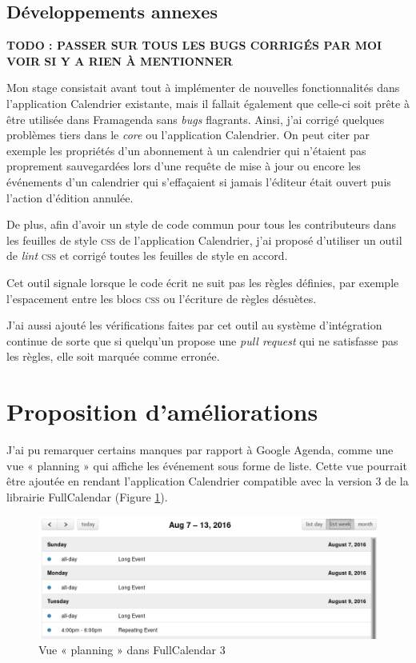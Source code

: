 \documentclass[10pt,a4paper, twoside]{report}
\begin{document}
	\subsection{Développements annexes}
	
	\textbf{\color{red}TODO : PASSER SUR TOUS LES BUGS CORRIGÉS PAR MOI VOIR SI Y A RIEN À MENTIONNER}
	
	Mon stage consistait avant tout à implémenter de nouvelles fonctionnalités dans l'application Calendrier existante, mais il fallait également que celle-ci soit prête à être utilisée dans Framagenda sans \textit{bugs} flagrants. Ainsi, j'ai corrigé quelques problèmes tiers dans le \textit{core} ou l'application Calendrier.
	On peut citer par exemple les propriétés d'un abonnement à un calendrier qui n'étaient pas proprement sauvegardées lors d'une requête de mise à jour ou encore les événements d'un calendrier qui s'effaçaient si jamais l'éditeur était ouvert puis l'action d'édition annulée.
	
	De plus, afin d'avoir un style de code commun pour tous les contributeurs dans les feuilles de style \textsc{css} de l'application Calendrier, j'ai proposé d'utiliser un outil de \textit{lint} \textsc{css} et corrigé toutes les feuilles de style en accord. 
	
	Cet outil signale lorsque le code écrit ne suit pas les règles définies, par exemple l'espacement entre les blocs \textsc{css} ou l'écriture de règles désuètes.
	
	J'ai aussi ajouté les vérifications faites par cet outil au système d'intégration continue de sorte que si quelqu'un propose une \textit{pull request} qui ne satisfasse pas les règles, elle soit marquée comme erronée.

	\section{Proposition d'améliorations}
	J'ai pu remarquer certains manques par rapport à Google Agenda, comme une vue « planning » qui affiche les événement sous forme de liste. Cette vue pourrait être ajoutée en rendant l'application Calendrier compatible avec la version 3 de la librairie FullCalendar (Figure \ref{planning-fullcalendar}).
	
	\begin{figure}[ht]
		\centering
		\centerline{\includegraphics[width=1.25\textwidth]{images/fullcalendar-3.png}}
		\caption{Vue « planning » dans FullCalendar 3}
		\label{planning-fullcalendar}
	\end{figure}
	
\end{document}
